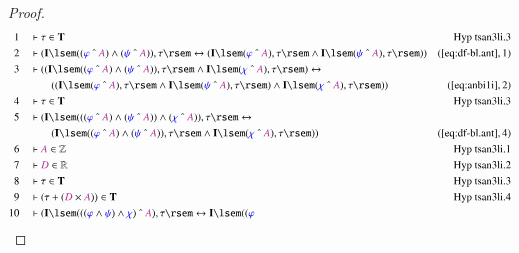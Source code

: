\begin{proof}
\begin{align}
  1 &&  & \vdash \tau \in \mathbf{T}&\text{Hyp~tsan3li.3}\notag%
  \\ 2 &&  & \vdash ( \mathbf{I} \lsem ( ( \mw{\varphi} ~\string^~ \mc{A} )
      \wedge ( \mw{\psi} ~\string^~ \mc{A} ) ) , \tau \rsem
      \leftrightarrow ( \mathbf{I} \lsem ( \mw{\varphi}
      ~\string^~ \mc{A} ) , \tau \rsem \wedge \mathbf{I}
      \lsem ( \mw{\psi} ~\string^~ \mc{A} ) , \tau \rsem )
      )&(\mbox{\ref{eq:df-bl.ant}},1)\notag
  \\ 3 &&  & \vdash ( ( \mathbf{I} \lsem ( ( \mw{\varphi} ~\string^~ \mc{A} )
      \wedge ( \mw{\psi} ~\string^~ \mc{A} ) ) , \tau \rsem
      \wedge \mathbf{I} \lsem ( \mw{\chi} ~\string^~ \mc{A}
      ) , \tau \rsem ) \leftrightarrow  \notag \\ & & & \qquad
     ( ( \mathbf{I} \lsem
      ( \mw{\varphi} ~\string^~ \mc{A} ) , \tau \rsem
      \wedge \mathbf{I} \lsem ( \mw{\psi} ~\string^~ \mc{A}
      ) , \tau \rsem ) \wedge \mathbf{I} \lsem ( \mw{\chi}
      ~\string^~ \mc{A} ) , \tau \rsem )
      )&(\mbox{\ref{eq:anbi1i}},2)\notag
  \\ 4 &&  & \vdash \tau \in \mathbf{T}&\text{Hyp~tsan3li.3}\notag%
  \\ 5 &&  & \vdash ( \mathbf{I} \lsem ( ( ( \mw{\varphi} ~\string^~ \mc{A} )
      \wedge ( \mw{\psi} ~\string^~ \mc{A} ) ) \wedge (
      \mw{\chi} ~\string^~ \mc{A} ) ) , \tau \rsem
      \leftrightarrow  \notag \\ & & & \qquad
     ( \mathbf{I} \lsem ( ( \mw{\varphi}
      ~\string^~ \mc{A} ) \wedge ( \mw{\psi} ~\string^~
      \mc{A} ) ) , \tau \rsem \wedge \mathbf{I} \lsem (
      \mw{\chi} ~\string^~ \mc{A} ) , \tau \rsem )
      )&(\mbox{\ref{eq:df-bl.ant}},4)\notag
  \\ 6 &&  & \vdash \mc{A} \in
      \mathbb{Z}&\text{Hyp~tsan3li.1}\notag%
  \\ 7 &&  & \vdash \mc{D} \in
      \mathbb{R}&\text{Hyp~tsan3li.2}\notag%
  \\ 8 &&  & \vdash \tau \in \mathbf{T}&\text{Hyp~tsan3li.3}\notag%
  \\ 9 &&  & \vdash ( \tau + ( \mc{D} \times \mc{A} ) ) \in
      \mathbf{T}&\text{Hyp~tsan3li.4}\notag%
  \\ 10 &&  & \vdash ( \mathbf{I} \lsem ( ( ( \mw{\varphi} \wedge \mw{\psi} )
      \wedge \mw{\chi} ) ~\string^~ \mc{A} ) , \tau \rsem
      \leftrightarrow \mathbf{I} \lsem ( ( \mw{\varphi}

\end{align}
\end{proof}
